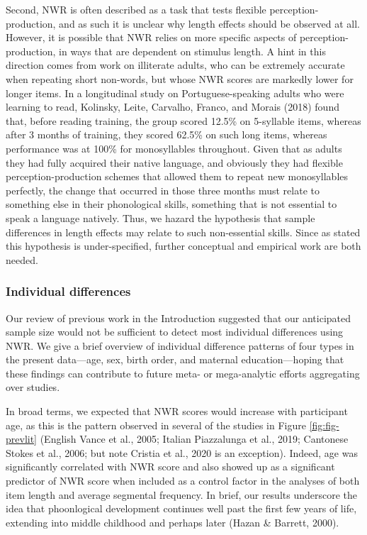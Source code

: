 \documentclass[english,,man,floatsintext]{apa6}
\begin{document}
Second, NWR is often described as a task that tests flexible perception-production, and as such it is unclear why length effects should be observed at all. However, it is possible that NWR relies on more specific aspects of perception-production, in ways that are dependent on stimulus length. A hint in this direction comes from work on illiterate adults, who can be extremely accurate when repeating short non-words, but whose NWR scores are markedly lower for longer items. In a longitudinal study on Portuguese-speaking adults who were learning to read, Kolinsky, Leite, Carvalho, Franco, and Morais (2018) found that, before reading training, the group scored 12.5\% on 5-syllable items, whereas after 3 months of training, they scored 62.5\% on such long items, whereas performance was at 100\% for monosyllables throughout. Given that as adults they had fully acquired their native language, and obviously they had flexible perception-production schemes that allowed them to repeat new monosyllables perfectly, the change that occurred in those three months must relate to something else in their phonological skills, something that is not essential to speak a language natively. Thus, we hazard the hypothesis that sample differences in length effects may relate to such non-essential skills. Since as stated this hypothesis is under-specified, further conceptual and empirical work are both needed.

\hypertarget{individual-differences}{%
\subsubsection{Individual differences}\label{individual-differences}}

Our review of previous work in the Introduction suggested that our anticipated sample size would not be sufficient to detect most individual differences using NWR. We give a brief overview of individual difference patterns of four types in the present data---age, sex, birth order, and maternal education---hoping that these findings can contribute to future meta- or mega-analytic efforts aggregating over studies.

In broad terms, we expected that NWR scores would increase with participant age, as this is the pattern observed in several of the studies in Figure \ref{fig:fig-prevlit} (English Vance et al., 2005; Italian Piazzalunga et al., 2019; Cantonese Stokes et al., 2006; but note Cristia et al., 2020 is an exception). Indeed, age was significantly correlated with NWR score and also showed up as a significant predictor of NWR score when included as a control factor in the analyses of both item length and average segmental frequency. In brief, our results underscore the idea that phoonlogical development continues well past the first few years of life, extending into middle childhood and perhaps later (Hazan \& Barrett, 2000).
\end{document}
